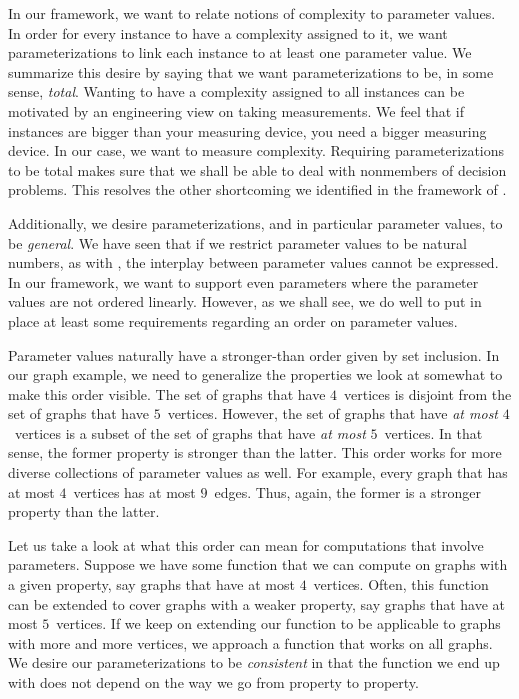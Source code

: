 In our framework, we want to relate notions of complexity to parameter values.
In order for every instance to have a complexity assigned to it, we want parameterizations to link each instance to at least one parameter value.
We summarize this desire by saying that we want parameterizations to be, in some sense, \emph{total}.
Wanting to have a complexity assigned to all instances can be motivated by an engineering view on taking measurements.
We feel that if instances are bigger than your measuring device, you need a bigger measuring device.
In our case, we want to measure complexity.
Requiring parameterizations to be total makes sure that we shall be able to deal with nonmembers of decision problems.
This resolves the other shortcoming we identified in the framework of \citeauthor{downey1999parameterized}.

Additionally, we desire parameterizations, and in particular parameter values, to be \emph{general}.
We have seen that if we restrict parameter values to be natural numbers, as with \citeauthor{flum2006parameterized}, the interplay between parameter values cannot be expressed.
In our framework, we want to support even parameters where the parameter values are not ordered linearly.
However, as we shall see, we do well to put in place at least some requirements regarding an order on parameter values.

Parameter values naturally have a stronger-than order given by set inclusion.
In our graph example, we need to generalize the properties we look at somewhat to make this order visible.
The set of graphs that have $4$~vertices is disjoint from the set of graphs that have $5$~vertices.
However, the set of graphs that have \emph{at most} $4$~vertices is a subset of the set of graphs that have \emph{at most} $5$~vertices.
In that sense, the former property is stronger than the latter.
This order works for more diverse collections of parameter values as well.
For example, every graph that has at most $4$~vertices has at most $9$~edges.
Thus, again, the former is a stronger property than the latter.

Let us take a look at what this order can mean for computations that involve parameters.
Suppose we have some function that we can compute on graphs with a given property, say graphs that have at most $4$~vertices.
Often, this function can be extended to cover graphs with a weaker property, say graphs that have at most $5$~vertices.
If we keep on extending our function to be applicable to graphs with more and more vertices, we approach a function that works on all graphs.
We desire our parameterizations to be \emph{consistent} in that the function we end up with does not depend on the way we go from property to property.

